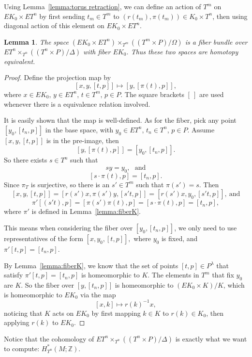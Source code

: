 \documentclass[12pt]{amsart}
\newtheorem{lemma}[theorem]{Lemma}
\theoremstyle{definition}
\numberwithin{equation}{section}
\begin{document}
Using Lemma~\ref{lemma:torus retraction}, we can define an action of
$T^m$ on $EK_{0}\times ET^n$ by first sending $t_{m}\in T^m$ to
$(r(t_{m}), \pi(t_{m}))\in K_{0}\times T^n$, then using diagonal
action of this element on $EK_{0}\times ET^n$.

\begin{lemma}\label{lemma:EK0 bundle}
 The space $(EK_{0}\times ET^n)\times_{T^m}((T^m\times P)/\Omega)$ is a
fiber bundle over\\  $ET^n\times_{T^n}((T^n\times P)/\Delta)$ with
fiber $EK_{0}$. Thus these two spaces are homotopy equivalent.
\end{lemma}
\begin{proof}
Define the projection map by
 \[[x,y,[t,p]]\mapsto
[y,[\pi(t),p]],\] where $x\in EK_{0}$, $y\in ET^n$, $t\in T^m$,
$p\in P$. The square brackets $[\ ]$ are used whenever there is a
equivalence relation involved.

It is easily shown that the map is well-defined. As for the fiber,
pick any point $[y_{0},[t_{n},p]]$ in the base space, with $y_{0}\in
ET^n$, $t_{n}\in T^n$, $p\in P$.
 Assume $[x,y,[t,p]]$
is in the pre-image, then \[[y,[\pi(t),p]]=[y_{0},[t_{n},p]].\]
 So there exists
$s\in T^n$ such that \[sy=y_{0},\ \ \  \mbox{and}\]
\[[s\cdot\pi(t),p]=[t_{n},p].\]
Since $\pi_{T}$ is surjective, so there is an $s'\in T^m$ such that
$\pi(s')=s$.
 Then \[[x,y,[t,p]]=[r(s')x,\pi(s')y,[s't,p]]=[r(s')x,
y_{0}, [s't,p]],\ \mbox{and}\]
 \[ \pi'[(s't),p]=[\pi(s')\pi(t),p]= [s\cdot\pi(t),p]= [t_{n},p],\]
 where $\pi'$ is defined in Lemma~\ref{lemma:fiberK}.

This means when considering the fiber over $[y_{0},[t_{n},p]]$, we
only need to use representatives of the form $[x,y_{0},[t,p]],$
where $y_{0}$ is fixed, and $\pi'[t,p]= [t_{n},p]$.

By Lemma~\ref{lemma:fiberK}, we know that the set of points
$[t,p]\in P^{\lambda}$ that satisfy $\pi'[t,p]=[t_{n},p]$ is
homeomorphic to $K$.
  The elements in
$T^m$ that fix $y_{0}$ are $K$.
 So the fiber over $[y,[t_{n},p]]$
is homeomorphic to $(EK_{0}\times K)/K$, which is homeomorphic to
$EK_{0}$ via the map \[[x,k]\mapsto r(k)^{-1}x,\] noticing that $K$
acts on $EK_{0}$ by first mapping $k\in K$ to $r(k)\in K_{0}$, then
applying $r(k)$ to $EK_{0}$.
\end{proof}

Notice that the cohomology of $ET^n\times_{T^n}((T^n\times
P)/\Delta)$ is exactly what we want to compute: $H_{T^n}^{*}(M;{{\mathbb{Z}}})$.
\end{document}
